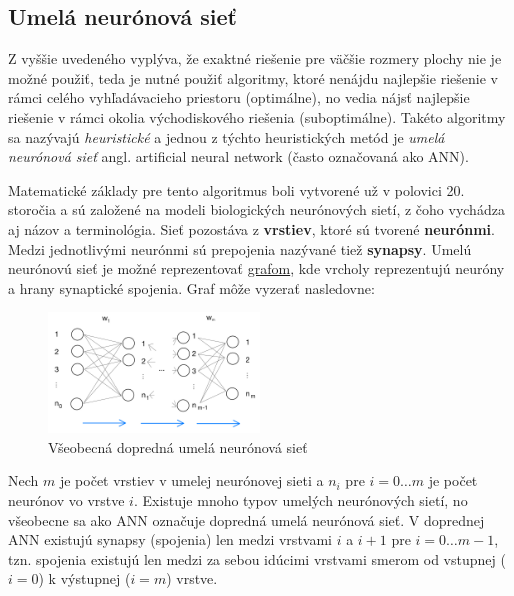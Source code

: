 \subsection{Umelá neurónová sieť}\label{subsec:algo-ann}

Z vyššie uvedeného vyplýva, že exaktné riešenie pre väčšie rozmery plochy nie je možné použiť, teda je nutné použiť
algoritmy, ktoré nenájdu najlepšie riešenie v rámci celého vyhľadávacieho priestoru (optimálne), no vedia nájsť
najlepšie riešenie v rámci okolia východiskového riešenia (suboptimálne).
Takéto algoritmy sa nazývajú \emph{heuristické} a jednou z týchto heuristických metód je \emph{umelá neurónová sieť}
angl. artificial neural network (často označovaná ako ANN).

Matematické základy pre tento algoritmus boli vytvorené už v polovici 20. storočia a sú založené na modeli
biologických neurónových sietí, z čoho vychádza aj názov a terminológia.
Sieť pozostáva z \textbf{vrstiev}, ktoré sú tvorené \textbf{neurónmi}.
Medzi jednotlivými neurónmi sú prepojenia nazývané tiež \textbf{synapsy}.
Umelú neurónovú sieť je možné reprezentovať \hyperref[figure:general-ann]{grafom}, kde vrcholy reprezentujú neuróny
a hrany synaptické spojenia.
Graf môže vyzerať nasledovne:
\begin{figure}[H]
    \centering
    \includegraphics[width=0.5\textwidth]{images/general-ann.jpg}
    \caption{Všeobecná dopredná umelá neurónová sieť}
\end{figure}\label{figure:general-ann}
Nech $m$ je počet vrstiev v umelej neurónovej sieti a $n_i$ pre $i = 0 \dots m$ je počet neurónov vo vrstve $i$.
Existuje mnoho typov umelých neurónových sietí, no všeobecne sa ako ANN označuje dopredná umelá neurónová sieť.
V doprednej ANN existujú synapsy (spojenia) len medzi vrstvami $i$ a $i + 1$ pre $i = 0 \dots m - 1$, tzn. spojenia
existujú len medzi za sebou idúcimi vrstvami smerom od vstupnej ($i=0$) k výstupnej ($i=m$) vrstve.

